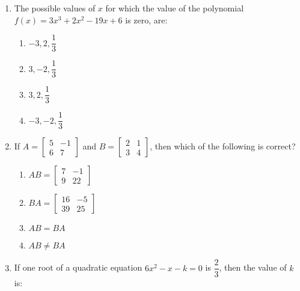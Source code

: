 \begin{enumerate}[label=(\roman*)]
    \item The possible values of $x$ for which the value of the polynomial
        $f(x) = 3x^3 + 2x^2 - 19x + 6$ is zero, are:

        \begin{multicols}{2}
        \begin{enumerate}[label=(\alph*)]
            \item $-3, 2, \dfrac13$ 
            \item $3, -2, \dfrac13$ 
            \item $3, 2, \dfrac13$ 
            \item $-3, -2, \dfrac13$ 
        \end{enumerate}
        \end{multicols}

    \item If $A = \begin{bmatrix*} 5 & -1 \\ 6 & 7 \end{bmatrix*}$ and 
        $B = \begin{bmatrix*} 2 & 1 \\ 3 & 4 \end{bmatrix*}$, then which of the 
        following is correct?

        \begin{multicols}{2}
        \begin{enumerate}[label=(\alph*)]
            \item $AB = \begin{bmatrix*} 7 & -1 \\ 9 & 22 \end{bmatrix*}$ 
            \item $BA = \begin{bmatrix*} 16 & -5 \\ 39 & 25 \end{bmatrix*}$ 
            \item $AB = BA$
            \item $AB \ne BA$
        \end{enumerate}
        \end{multicols}

    \item If one root of a quadratic equation $6x^2 -x -k = 0$ is $\dfrac23$,
        then the value of $k$ is:


\end{enumerate}
